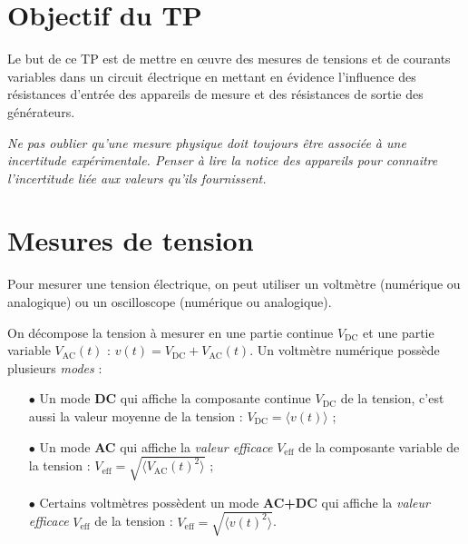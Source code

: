 \documentclass{tp}
\begin{document}

\section{Objectif du TP}
Le but de ce TP est de mettre en \oe uvre des mesures de tensions et de courants variables dans un circuit électrique en mettant en évidence l'influence des résistances d'entrée des appareils de mesure et des résistances de sortie des générateurs.

\vspace{1em}
\textit{Ne pas oublier qu'une mesure physique doit toujours être associée à une incertitude expérimentale. Penser à lire la notice des appareils pour connaitre l'incertitude liée aux valeurs qu'ils fournissent.}

\section{Mesures de tension}
Pour mesurer une tension électrique, on peut utiliser un voltmètre (numérique ou analogique) ou un oscilloscope (numérique ou analogique). 

On décompose la tension à mesurer en une partie continue $V_\text{DC}$ et une partie variable $V_\text{AC}(t)$ : $v(t)=V_\text{DC}+V_\text{AC}(t)$. Un voltmètre numérique possède plusieurs \emph{modes} : 
\begin{itemize}
	\item[$\bullet$] Un mode \textbf{DC} qui affiche la composante continue $V_\text{DC}$ de la tension, c'est aussi la valeur moyenne de la tension : $V_\text{DC}=\langle v(t) \rangle$ ;

	\item[$\bullet$] Un mode \textbf{AC} qui affiche la \emph{valeur efficace} $V_\text{eff}$ de la composante variable de la tension : $V_\text{eff}=\sqrt{\langle V_\text{AC}(t)^2 \rangle}$ ;

	\item[$\bullet$] Certains voltmètres possèdent un mode \textbf{AC+DC} qui affiche la \emph{valeur efficace} $V_\text{eff}$ de la tension : $V_\text{eff}=\sqrt{\langle v(t)^2 \rangle}$.
\end{itemize}
\end{document}
